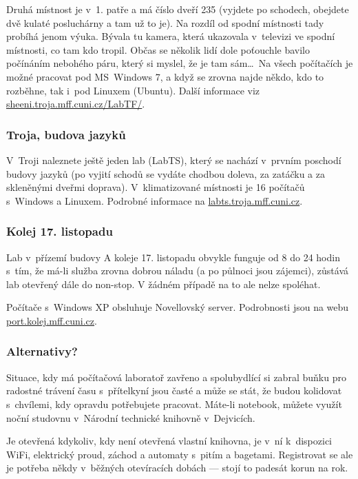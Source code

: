 Druhá místnost je v~1. patře a má číslo dveří 235 (vyjdete po
schodech, obejdete dvě kulaté posluchárny a tam už to je).  Na rozdíl od spodní místnosti tady probíhá jenom výuka. Bývala tu kamera, která ukazovala v~televizi ve spodní místnosti, co tam kdo tropil.
Občas se několik lidí dole
poťouchle bavilo počínáním nebohého páru, který si myslel, že je
tam sám\dots\ Na všech počítačích je možné pracovat pod
MS~Windows 7, a když se zrovna najde někdo, kdo to rozběhne, tak
i~pod Linuxem (Ubuntu). Další informace viz \url{sheeni.troja.mff.cuni.cz/LabTF/}.


\subsubsection{Troja, budova jazyků}

V~Troji naleznete ještě jeden lab (LabTS), který se nachází
v~prvním poschodí budovy jazyků (po vyjití schodů se vydáte chodbou
doleva, za zatáčku a za skleněnými dveřmi doprava).
V~klimatizované místnosti je 16 počítačů s~Windows a Linuxem.
Podrobné informace na \url{labts.troja.mff.cuni.cz}.

\subsubsection{Kolej 17. listopadu}

Lab v~přízemí budovy A koleje 17. listopadu obvykle funguje od 8 do 24 hodin s~tím, že má-li služba zrovna dobrou náladu (a po půlnoci jsou zájemci), zůstává lab otevřený dále do non-stop. V žádném případě na to ale nelze spoléhat.

Počítače s~Windows XP obsluhuje Novellovský server. Podrobnosti jsou na webu \url{port.kolej.mff.cuni.cz}.

\subsubsection{Alternativy?}

Situace, kdy má počítačová laboratoř zavřeno a spolubydlící si zabral buňku pro radostné trávení času s~přítelkyní jsou časté a může se stát, že budou kolidovat s~chvílemi, kdy opravdu potřebujete pracovat. Máte-li notebook, můžete využít noční studovnu v~Národní technické knihovně v~Dejvicích.

Je otevřená kdykoliv, kdy není otevřená vlastní knihovna, je v~ní k~dispozici WiFi, elektrický proud, záchod a automaty s~pitím a bagetami. Registrovat se ale je potřeba někdy v~běžných otevíracích dobách --- stojí to padesát korun na rok.